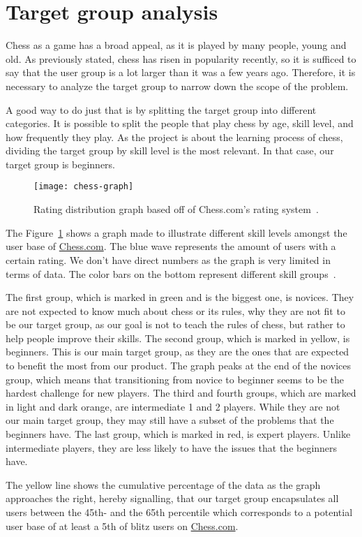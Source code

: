 \section{Target group analysis}\label{sec:target-group-analysis}

Chess as a game has a broad appeal, as it is played by many people, young and old.
As previously stated, chess has risen in popularity recently, so it is sufficed to say that the user group is a lot
larger than it was a few years ago.
Therefore, it is necessary to analyze the target group to narrow down the scope of the problem.

A good way to do just that is by splitting the target group into different categories.
It is possible to split the people that play chess by age, skill level, and how frequently they play.
As the project is about the learning process of chess, dividing the target group by skill level is the most relevant.
In that case, our target group is beginners.

\begin{figure}
    \centering
    \texttt{[image: chess-graph]}
    \caption{Rating distribution graph based off of Chess.com's rating system~\cite{chess-ratings}.}\label{fig:graph}
\end{figure}

The Figure~\ref{fig:graph} shows a graph made to illustrate different skill levels amongst the user base
of \url{Chess.com}.
The blue wave represents the amount of users with a certain rating.
We don't have direct numbers as the graph is very limited in terms of data.
The color bars on the bottom represent different skill groups~\cite{chess-ratings}.

The first group, which is marked in green and is the biggest one, is novices.
They are not expected to know much about chess or its rules, why they are not fit to be our target group, as our
goal is not to teach the rules of chess, but rather to help people improve their skills.
The second group, which is marked in yellow, is beginners.
This is our main target group, as they are the ones that are expected to benefit the most from our product.
The graph peaks at the end of the novices group, which means that transitioning from novice to beginner seems to be the
hardest challenge for new players.
The third and fourth groups, which are marked in light and dark orange, are intermediate 1 and 2 players.
While they are not our main target group, they may still have a subset of the problems that the beginners have.
The last group, which is marked in red, is expert players.
Unlike intermediate players, they are less likely to have the issues that the beginners have.

The yellow line shows the cumulative percentage of the data as the graph approaches the right, hereby signalling, that
our target group encapsulates all users between the 45th- and the 65th percentile which corresponds to a potential user
base of at least a 5th of blitz users on \url{Chess.com}.
